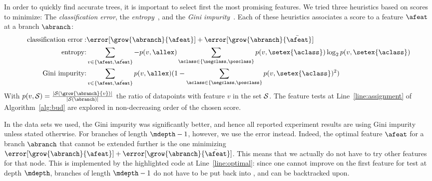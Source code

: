 \documentclass{article}
\begin{document}
In order to quickly find accurate trees, it is important to select first the most promising features. We tried three heuristics based on scores to minimize: The \emph{classification error}, the \emph{entropy}~\cite{10.1023/A:1022643204877}, and the \emph{Gini impurity}~\cite{breiman1984classification}. 
Each of these heuristics associates a score to a feature $\afeat$ at a branch $\abranch$:
\begin{eqnarray}
	\textrm{classification error}: & \error[\grow{\abranch}{\afeat}] + \error[\grow{\abranch}{\bar{\afeat}}] \\
	\textrm{entropy:} & \sum\limits_{v \in \{\afeat,\bar{\afeat}\}} -p(v,\allex) \sum\limits_{\aclass \in \{\negclass,\posclass\}} p(v,\setex{\aclass}) \log_{2} p(v,\setex{\aclass}) \\
	\textrm{Gini impurity:} &  \sum\limits_{v \in \{\afeat,\bar{\afeat}\}} p(v,\allex)(1 - \sum\limits_{\aclass \in \{\negclass,\posclass\}} p(v,\setex{\aclass})^2)
\end{eqnarray}
With $p(v,{\cal S}) = \frac{|{\cal S}(\grow{\abranch}{v})|}{|{\cal S}(\abranch)|}$ the ratio of datapoints with feature $v$ in the set ${\cal S}$.
%
 The
feature tests at Line~\ref{line:assignment} of Algorithm~\ref{alg:bud} are explored in non-decreasing order of the chosen score.

In the data sets we used, the Gini impurity was significantly better, and hence all reported experiment results are using Gini impurity unless stated otherwise. For branches of length $\mdepth-1$, however, we use the error instead. Indeed, the optimal feature $\afeat$ for a branch $\abranch$ that cannot be extended further is the one minimizing 
$\error[\grow{\abranch}{\afeat}] + \error[\grow{\abranch}{\bar{\afeat}}]$.
This means that we actually do not have to try other features for that node. This is implemented by the highlighted code at Line~\ref{line:optimal}: since one cannot improve on the first feature for test at depth $\mdepth$, branches of length $\mdepth-1$ do not have to be put back into \bud, and can be backtracked upon.
\end{document}

